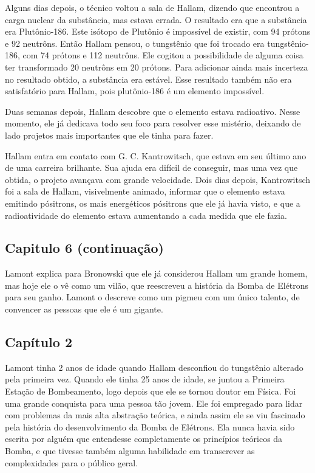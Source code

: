 \documentclass[14pt,portuguese]{extreport}
\begin{document}
    	  Alguns dias depois, o técnico voltou a sala de Hallam, dizendo que encontrou a carga nuclear da substância, mas estava errada. O resultado era que a substância era Plutônio-186. 
    	  Este isótopo de Plutônio é impossível de existir, com 94 prótons e 92 neutrôns. Então Hallam pensou, o tungstênio que foi trocado era tungstênio-186, com 74 prótons e 112 neutrôns. 
    	  Ele cogitou a possibilidade de alguma coisa ter transformado 20 neutrôns em 20 prótons. Para adicionar ainda mais incerteza no resultado obtido, a substância era estável. 
    	  Esse resultado também não era satisfatório para Hallam, pois plutônio-186 é um elemento impossível.
    	  
    	  Duas semanas depois, Hallam descobre que o elemento estava radioativo. Nesse momento, ele já dedicava todo seu foco para resolver esse mistério, deixando de lado projetos mais importantes que ele 
    	  tinha para fazer. 
    	  
    	  Hallam entra em contato com G. C. Kantrowitsch, que estava em seu último ano de uma carreira brilhante. Sua ajuda era difícil de conseguir, mas uma vez que obtida, o projeto 
    	  avançava com grande velocidade. Dois dias depois, Kantrowitsch foi a sala de Hallam, visivelmente animado, informar que o elemento estava emitindo pósitrons, os mais energéticos pósitrons que 
    	  ele já havia visto, e que a radioatividade do elemento estava aumentando a cada medida que ele fazia.

      \subsection{Capitulo 6 (continuação)}

    	  Lamont explica para Bronowski que ele já considerou Hallam um grande homem, mas hoje ele o vê como um vilão, que reescreveu a história da Bomba de Elétrons para seu ganho. 
    	  Lamont o descreve como um pigmeu com um único talento, de convencer as pessoas que ele é um gigante.
      
      \subsection{Capítulo 2}

    	  Lamont tinha 2 anos de idade quando Hallam desconfiou do tungstênio alterado pela primeira vez. Quando ele tinha 25 anos de idade, se juntou a Primeira Estação de Bombeamento, 
    	  logo depois que ele se tornou doutor em Física. Foi uma grande conquista para uma pessoa tão jovem. Ele foi empregado para lidar com problemas da mais alta abstração teórica, 
    	  e ainda assim ele se viu fascinado pela história do desenvolvimento da Bomba de Elétrons. Ela nunca havia sido escrita por alguém que entendesse completamente os princípios 
    	  teóricos da Bomba, e que tivesse também alguma habilidade em transcrever as complexidades para o público geral.
    	  
\end{document}
